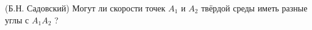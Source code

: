 (Б.Н. Садовский)
Могут ли скорости точек $A_{1}$ и $A_{2}$ твёрдой среды иметь разные углы с
$A_{1}A_{2}$ ?
